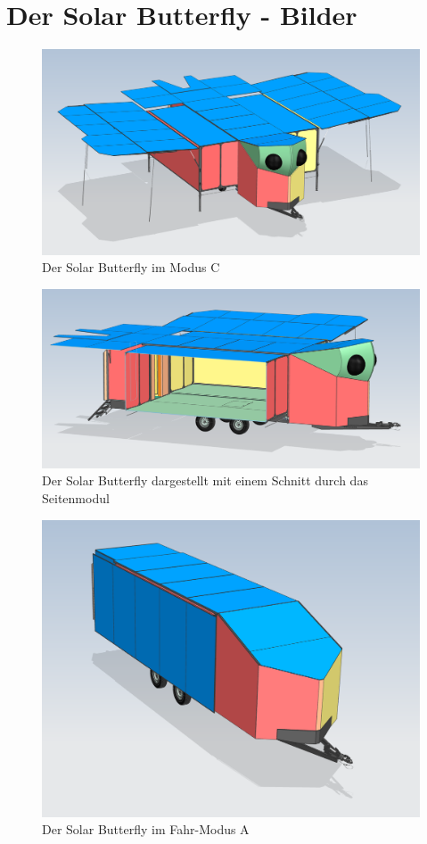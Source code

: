 \section{Der Solar Butterfly - Bilder}
\label{Bilder SB}
\begin{figure}[H]
  \includegraphics[width=\linewidth]{04_Figures/SB10.png}
  \caption{Der Solar Butterfly im Modus C}
  \label{img:SB10}
\end{figure}
\begin{figure}[H]
  \includegraphics[width=\linewidth]{04_Figures/SB12.png}
  \caption{Der Solar Butterfly dargestellt mit einem Schnitt durch das Seitenmodul}
  \label{img:SB12}
\end{figure}
\begin{figure}[H]
  \includegraphics[width=\linewidth]{04_Figures/SB11.png}
  \caption{Der Solar Butterfly im Fahr-Modus A}
  \label{img:SB11}
\end{figure}
